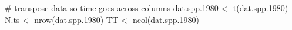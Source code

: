 \begin{Schunk}
\begin{Sinput}
 # transpose data so time goes across columns
 dat.spp.1980 <- t(dat.spp.1980)
 N.ts <- nrow(dat.spp.1980)
 TT <- ncol(dat.spp.1980)
\end{Sinput}
\end{Schunk}
